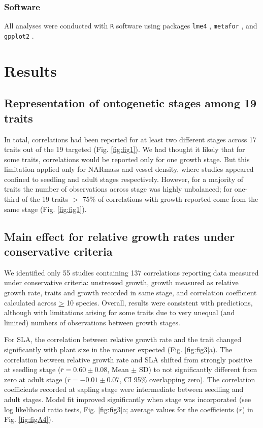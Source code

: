 \documentclass[a4paper,11pt]{article}
\begin{document}
\subsubsection*{Software}

All analyses were conducted with \texttt{R} software \citep{Ralanguageanden:2014wf} using packages \texttt{lme4} \citep{Bates-2014}, \texttt{metafor} \citep{Viechtbauer-2010}, and \texttt{gpplot2} \citep{Wickham:2009}.


\section*{Results}\label{results}

\subsection*{Representation of ontogenetic stages among 19 traits}
In total, correlations had been reported for at least two different stages across 17 traits out of the 19 targeted (Fig. \ref{fig:fig1}). We had thought it likely that for some traits, correlations would be reported only for one growth stage. But this limitation applied only for NARmass and vessel density, where studies appeared confined to seedling and adult stages respectively. However, for a majority of traits the number of observations across stage was highly unbalanced; for one-third of the 19 traits $>$ 75\% of correlations with growth reported come from the same stage (Fig. \ref{fig:fig1}).

\subsection*{Main effect for relative growth rates under conservative criteria}

We identified only 55 studies containing 137 correlations reporting data measured under conservative criteria: unstressed growth, growth measured as relative growth rate, traits and growth recorded in same stage, and correlation coefficient calculated across \underline{\textgreater} 10 species. Overall, results were consistent with predictions, although with limitations arising for some traits due to very unequal (and limited) numbers of observations between growth stages. 

For SLA, the correlation between relative growth rate and the trait changed significantly with plant size in the manner expected (Fig. \ref{fig:fig3}a). The correlation between relative growth rate and SLA shifted from strongly positive at seedling stage ($\bar{r}=0.60 \pm 0.08$, Mean $\pm$ SD) to not significantly different from zero at adult stage ($\bar{r}= -0.01 \pm 0.07$, CI 95\% overlapping zero). The correlation coefficients recorded at sapling stage were intermediate between seedling and adult stages. Model fit improved significantly when stage was incorporated (see log likelihood ratio tests, Fig. \ref{fig:fig3}a; average values for the coefficients ($\bar{r}$) in Fig. \ref{fig:figA4}).
\end{document}
